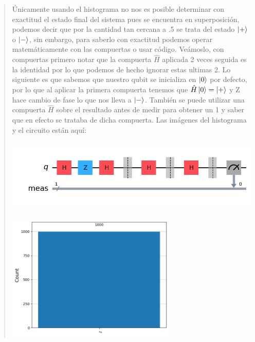 \begin{quote}
    Únicamente usando el histograma no nos es posible determinar con exactitud el estado final
    del sistema pues se encuentra en superposición, podemos decir que por la cantidad tan
    cercana a .5 se trata del estado $\ket{+}$ o $\ket{-}$, sin embargo, para saberlo con
    exactitud podemos operar matemáticamente con las compuertas o usar código. Veámoslo, con
    compuertas primero notar que la compuerta $\hat{H}$ aplicada 2 veces seguida es la
    identidad por lo que podemos de hecho ignorar estas ultimas 2. Lo siguiente es que
    sabemos que nuestro qubit se inicializa en $\ket{0}$ por defecto, por lo que al aplicar
    la primera compuerta tenemos que $\hat{H}\ket{0}=\ket{+}$ y Z hace cambio de fase lo que
    nos lleva a $\ket{-}$. También se puede utilizar una compuerta $\hat{H}$ sobre el
    resultado antes de medir para obtener un 1 y saber que en efecto se trataba de dicha
    compuerta. Las imágenes del histograma y el circuito están aquí:

    \begin{center}
        \includegraphics[height=3.5cm]{src/Img/2.3.png}
    \end{center}

    \begin{center}
        \includegraphics[height=6cm]{src/Img/2.4.png}
    \end{center}
\end{quote}
